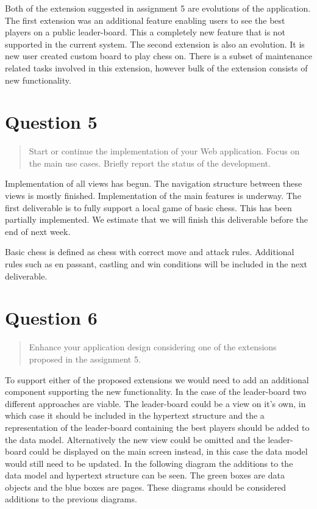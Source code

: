 \documentclass[10pt,a4paper]{report}
\begin{document}
Both of the extension suggested in assignment 5 are evolutions of the application. The first extension was an additional feature enabling users to see the best players on a public leader-board. This a completely new feature that is not supported in the current system. The second extension is also an evolution. It is new user created custom board to play chess on. There is a subset of maintenance related tasks involved in this extension, however bulk of the extension consists of new functionality.

\section{Question 5}
\begin{quote}
Start or continue the implementation of your Web application. Focus on the main use cases. Briefly report the status of the development.
\end{quote}
Implementation of all views has begun. The navigation structure between these views is mostly finished. Implementation of the main features is underway. The first deliverable is to fully support a local game of basic chess. This has been partially implemented. We estimate that we will finish this deliverable before the end of next week.

Basic chess is defined as chess with correct move and attack rules. Additional rules such as en passant, castling and win conditions will be included in the next deliverable.

\section{Question 6}
\begin{quote}
Enhance your application design considering one of the extensions proposed in the assignment 5.
\end{quote}

To support either of the proposed extensions we would need to add an additional component supporting the new functionality. In the case of the leader-board two different approaches are viable. The leader-board could be a view on it's own, in which case it should be included in the hypertext structure and the a representation of the leader-board containing the best players should be added to the data model. Alternatively the new view could be omitted and the leader-board could be displayed on the main screen instead, in this case the data model would still need to be updated. In the following diagram the additions to the data model and hypertext structure can be seen. The green boxes are data objects and the blue boxes are pages. These diagrams should be considered additions to the previous diagrams.
\end{document}
